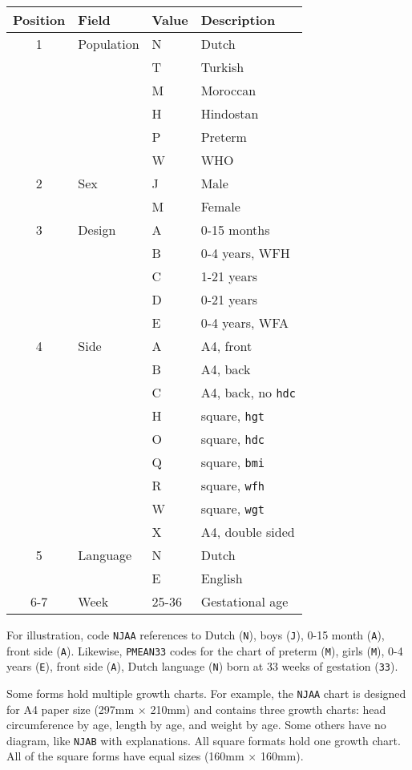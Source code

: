 \documentclass[
]{book}
\begin{document}
\begin{longtable}[]{@{}clll@{}}
\toprule
Position & Field & Value & Description \\
\midrule
\endhead
1 & Population & N & Dutch \\
& & T & Turkish \\
& & M & Moroccan \\
& & H & Hindostan \\
& & P & Preterm \\
& & W & WHO \\
2 & Sex & J & Male \\
& & M & Female \\
3 & Design & A & 0-15 months \\
& & B & 0-4 years, WFH \\
& & C & 1-21 years \\
& & D & 0-21 years \\
& & E & 0-4 years, WFA \\
4 & Side & A & A4, front \\
& & B & A4, back \\
& & C & A4, back, no \texttt{hdc} \\
& & H & square, \texttt{hgt} \\
& & O & square, \texttt{hdc} \\
& & Q & square, \texttt{bmi} \\
& & R & square, \texttt{wfh} \\
& & W & square, \texttt{wgt} \\
& & X & A4, double sided \\
5 & Language & N & Dutch \\
& & E & English \\
6-7 & Week & 25-36 & Gestational age \\
\bottomrule
\end{longtable}

For illustration, code \texttt{NJAA} references to Dutch (\texttt{N}), boys (\texttt{J}), 0-15 month (\texttt{A}), front side (\texttt{A}). Likewise, \texttt{PMEAN33} codes for the chart of preterm (\texttt{M}), girls (\texttt{M}), 0-4 years (\texttt{E}), front side (\texttt{A}), Dutch language (\texttt{N}) born at 33 weeks of gestation (\texttt{33}).

Some forms hold multiple growth charts. For example, the \texttt{NJAA} chart is designed for A4 paper size (297mm \(\times\) 210mm) and contains three growth charts: head circumference by age, length by age, and weight by age. Some others have no diagram, like \texttt{NJAB} with explanations. All square formats hold one growth chart. All of the square forms have equal sizes (160mm \(\times\) 160mm).
\end{document}
